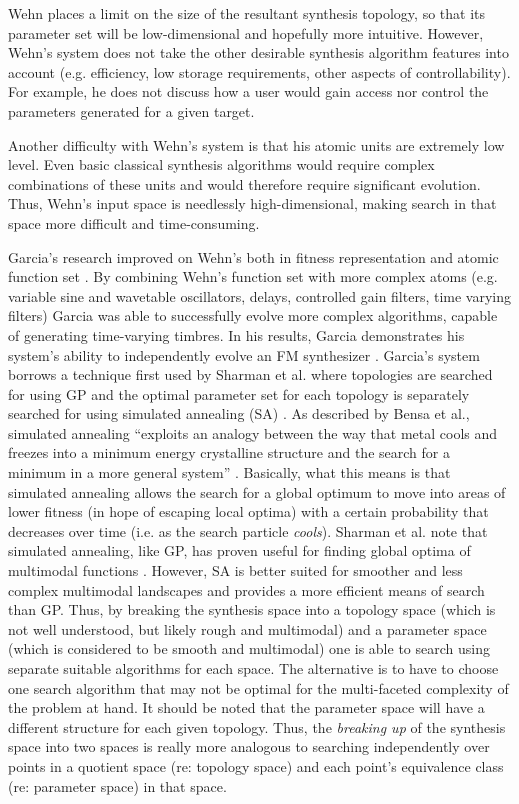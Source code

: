 \documentclass[a4paper,12pt]{report} 	%
\numberwithin{figure}{chapter}
\numberwithin{table}{chapter}
\numberwithin{equation}{chapter}
\begin{document}
\begin{flushleft}
Wehn places a limit on the size of the resultant synthesis topology, so that its parameter set will be low-dimensional and hopefully more intuitive. However, Wehn's system does not take the other desirable synthesis algorithm features into account (e.g. efficiency, low storage requirements, other aspects of controllability). For example, he does not discuss how a user would gain access nor control the parameters generated for a given target.

Another difficulty with Wehn's system is that his atomic units are extremely low level. Even basic classical synthesis algorithms would require complex combinations of these units and would therefore require significant evolution. Thus, Wehn's input space is needlessly high-dimensional, making search in that space more difficult and time-consuming.

Garcia's research improved on Wehn's both in fitness representation and atomic function set \cite{Garcia:2002cq}. By combining Wehn's function set with more complex atoms (e.g. variable sine and wavetable oscillators, delays, controlled gain filters, time varying filters) Garcia was able to successfully evolve more complex algorithms, capable of generating time-varying timbres. In his results, Garcia demonstrates his system's ability to independently evolve an FM synthesizer  \cite[p. 6]{Garcia:2002cq}. Garcia's system borrows a technique first used by Sharman et al. where topologies are searched for using GP and the optimal parameter set for each topology is separately searched for using simulated annealing (SA) \cite{Sharman:1995bs}. As described by Bensa et al., simulated annealing ``exploits an analogy between the way that metal cools and freezes into a minimum energy crystalline structure and the search for a minimum in a more general system'' \cite[p. 501]{Bensa:2005xq}. Basically, what this means is that simulated annealing allows the search for a global optimum to move into areas of lower fitness (in hope of escaping local optima) with a certain probability that decreases over time (i.e. as the search particle \emph{cools}). Sharman et al. note that simulated annealing, like GP, has proven useful for finding global optima of multimodal functions \cite[p. 1]{Sharman:1995bs}. However, SA is better suited for smoother and less complex multimodal landscapes and provides a more efficient means of search than GP. Thus, by breaking the synthesis space into a topology space (which is not well understood, but likely rough and multimodal) and a parameter space (which is considered to be smooth and multimodal) one is able to search using separate suitable algorithms for each space. The alternative is to have to choose one search algorithm that may not be optimal for the multi-faceted complexity of the problem at hand. It should be noted that the parameter space will have a different structure for each given topology. Thus, the \emph{breaking up} of the synthesis space into two spaces is really more analogous to searching independently over points in a quotient space (re: topology space) and each point's equivalence class (re: parameter space) in that space.


\end{flushleft}
\end{document}
